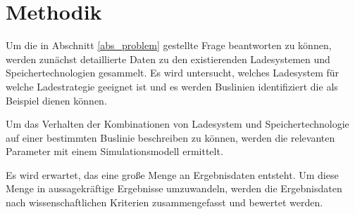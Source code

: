\section{Methodik}
Um die in Abschnitt \ref{abs_problem} gestellte Frage beantworten zu können, werden zunächst detaillierte Daten zu den existierenden Ladesystemen und Speichertechnologien gesammelt. Es wird untersucht, welches Ladesystem für welche Ladestrategie geeignet ist und es werden Buslinien identifiziert die als Beispiel dienen können.

Um das Verhalten der Kombinationen von Ladesystem und Speichertechnologie auf einer bestimmten Buslinie beschreiben zu können, werden die relevanten Parameter mit einem Simulationsmodell ermittelt.

Es wird erwartet, das eine große Menge an Ergebnisdaten entsteht. Um diese Menge in aussagekräftige Ergebnisse umzuwandeln, werden die Ergebnisdaten nach wissenschaftlichen Kriterien zusammengefasst und bewertet werden.